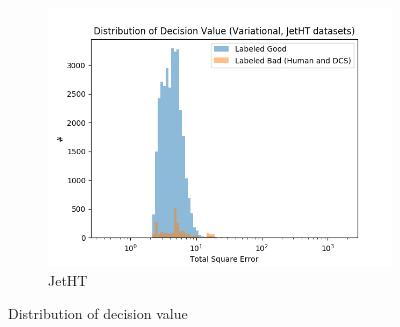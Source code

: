 \begin{figure}[h!]
\begin{subfigure}[b]{0.49\linewidth}
        \includegraphics[width=\linewidth]{images/reco/2018/feature_2/se_dist_Variational1f2_JetHT_unlog.png}
        \caption{JetHT}
    \end{subfigure}
    \caption{Distribution of decision value}
\label{fig:2018_f2_se_dist}
\end{figure}